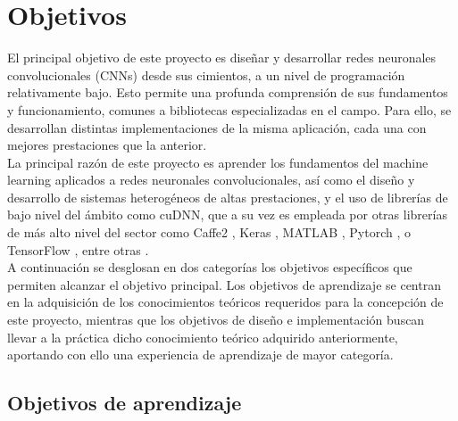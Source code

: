 \section{Objetivos}

El principal objetivo de este proyecto es diseñar y desarrollar redes neuronales convolucionales (CNNs) desde sus cimientos, a un nivel de programación relativamente bajo. Esto permite una profunda comprensión de sus fundamentos y funcionamiento, comunes a bibliotecas especializadas en el campo. Para ello, se desarrollan distintas implementaciones de la misma aplicación, cada una con mejores prestaciones que la anterior. \\
La principal razón de este proyecto es aprender los fundamentos del machine learning aplicados a redes neuronales convolucionales, así como el diseño y desarrollo de sistemas heterogéneos de altas prestaciones, y el uso de librerías de bajo nivel del ámbito como cuDNN, que a su vez es empleada por otras librerías de más alto nivel del sector como Caffe2 \cite{Caffe2}, Keras \cite{Keras}, MATLAB \cite{Matlab}, Pytorch \cite{Pytorch}, o TensorFlow \cite{Tensorflow}, entre otras \cite{cuDNN_librerias}. \\
A continuación se desglosan en dos categorías los objetivos específicos que permiten alcanzar el objetivo principal. Los objetivos de aprendizaje se centran en la adquisición de los conocimientos teóricos requeridos para la concepción de este proyecto, mientras que los objetivos de diseño e implementación buscan llevar a la práctica dicho conocimiento teórico adquirido anteriormente, aportando con ello una experiencia de aprendizaje de mayor categoría.

\subsection{Objetivos de aprendizaje}

